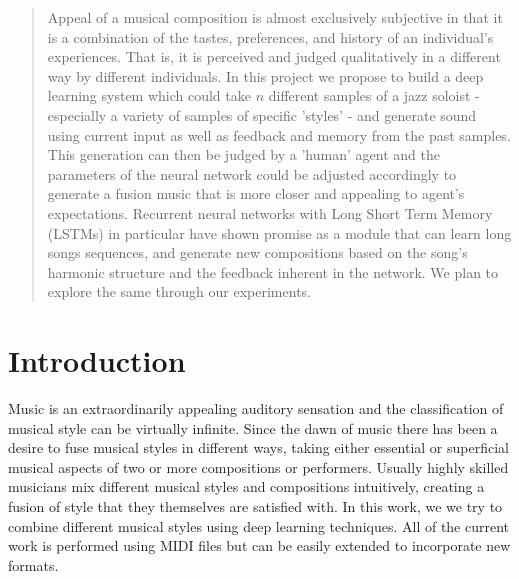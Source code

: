 \documentclass[conference]{IEEEtran}
\begin{document}




\maketitle

\begin{abstract}
Appeal of a musical composition is almost exclusively subjective in that it is a combination of the tastes, preferences, and history of an individual's experiences. That is, it is perceived and judged qualitatively in a different way by different individuals. In this project we propose to build a deep learning system which could take $n$ different samples of a jazz soloist - especially a variety of samples of specific 'styles' - and generate sound using current input as well as feedback and memory from the past samples. This generation can then be judged by a 'human' agent and the parameters of the neural network could be adjusted accordingly to generate a fusion music that is more closer and appealing to agent's expectations. Recurrent neural networks with Long Short Term Memory (LSTMs) in particular have shown promise as a module that can learn long songs sequences, and generate new compositions based on the song's harmonic structure and the feedback inherent in the network. \cite{judy2} We plan to explore the same through our experiments.
\end{abstract}





%
\IEEEpeerreviewmaketitle



\section{Introduction}
Music is an extraordinarily appealing auditory sensation and the classification of musical style can be virtually infinite. Since the dawn of music there has been a desire to fuse musical styles in different ways, taking either essential or superficial musical aspects of two or more compositions or performers. Usually highly skilled musicians mix different musical styles and compositions intuitively, creating a fusion of style that they themselves are satisfied with. In this work, we we try to combine different musical styles using deep learning techniques. All of the current work is performed using MIDI files but can be easily extended to incorporate new formats.\\
\end{document}
